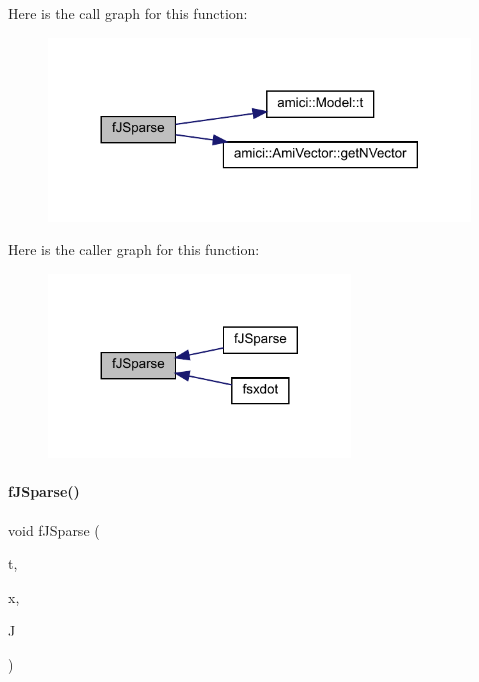 Here is the call graph for this function\+:
\nopagebreak
\begin{figure}[H]
\begin{center}
\leavevmode
\includegraphics[width=317pt]{classamici_1_1_model___o_d_e_a3147c7a327fead438efe714f04491c82_cgraph}
\end{center}
\end{figure}
Here is the caller graph for this function\+:
\nopagebreak
\begin{figure}[H]
\begin{center}
\leavevmode
\includegraphics[width=227pt]{classamici_1_1_model___o_d_e_a3147c7a327fead438efe714f04491c82_icgraph}
\end{center}
\end{figure}
\mbox{\label{classamici_1_1_model___o_d_e_a741ef44fe870908155c0e59bb1a6c059}} 
\paragraph{\texorpdfstring{f\+J\+Sparse()}{fJSparse()}\hspace{0.1cm}{\footnotesize\ttfamily [2/3]}}
{\footnotesize\ttfamily void f\+J\+Sparse (\begin{DoxyParamCaption}\item[{\mbox{\hyperlink{namespaceamici_a1bdce28051d6a53868f7ccbf5f2c14a3}{realtype}}}]{t,  }\item[{N\+\_\+\+Vector}]{x,  }\item[{Sls\+Mat}]{J }\end{DoxyParamCaption})}

